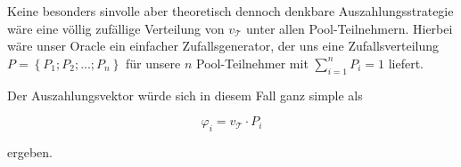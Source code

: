 \vspace{0.2cm}

\begin{Example}

Keine besonders sinvolle aber theoretisch dennoch denkbare Auszahlungsstrategie wäre eine völlig zufällige Verteilung von $v_{\mathcal{T}}$ unter allen Pool-Teilnehmern. Hierbei wäre unser Oracle ein einfacher Zufallsgenerator, der uns eine Zufallsverteilung $P = \left\{ P_1; P_2;...;P_n \right\}$ für unsere $n$ Pool-Teilnehmer mit $\sum_{i=1}^n P_i = 1$ liefert.

\vspace{0.2cm}

Der Auszahlungsvektor würde sich in diesem Fall ganz simple als

\begin{equation*}
  \varphi_i = v_{\mathcal{T}} \cdot P_i
\end{equation*}

ergeben. 

\end{Example}


\vspace{0.5cm}